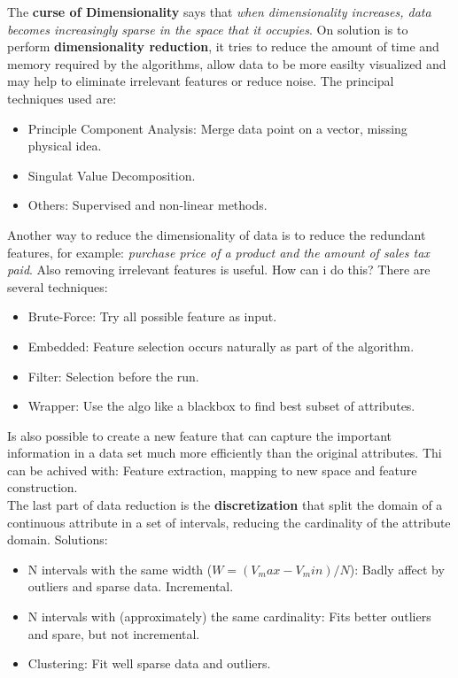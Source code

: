 \documentclass[12pt]{article}
\begin{document}
The \textbf{curse of Dimensionality} says that \textit{when dimensionality increases, data becomes increasingly sparse in the space that it occupies}. On solution is to perform \textbf{dimensionality reduction}, it tries to reduce the amount of time and memory required by the algorithms, allow data to be more easilty visualized and may help to eliminate irrelevant features or reduce noise. The principal techniques used are:
\begin{itemize}
  \item Principle Component Analysis: Merge data point on a vector, missing physical idea.
  \item Singulat Value Decomposition.
  \item Others: Supervised and non-linear methods.
\end{itemize}
Another way to reduce the dimensionality of data is to reduce the redundant features, for example: \textit{purchase price of a product and the amount of sales tax paid}. Also removing irrelevant features is useful. How can i do this? There are several techniques:
\begin{itemize}
  \item Brute-Force: Try all possible feature as input.
  \item Embedded: Feature selection occurs naturally as part of the algorithm.
  \item Filter: Selection before the run.
  \item Wrapper: Use the algo like a blackbox to find best subset of attributes.
\end{itemize}
Is also possible to create a new feature that can capture the important information in a data set much more efficiently than the original attributes. Thi can be achived with: Feature extraction, mapping to new space and feature construction.\\
The last part of data reduction is the \textbf{discretization} that split the domain of a continuous attribute in a set of intervals, reducing the cardinality of the attribute domain. Solutions:
\begin{itemize}
  \item N intervals with the same width ($W=(V_max - V_min)/N$): Badly affect by outliers and sparse data. Incremental.
  \item N intervals with (approximately) the same cardinality: Fits better outliers and spare, but not incremental.
  \item Clustering: Fit well sparse data and outliers.
\end{itemize}
\end{document}
